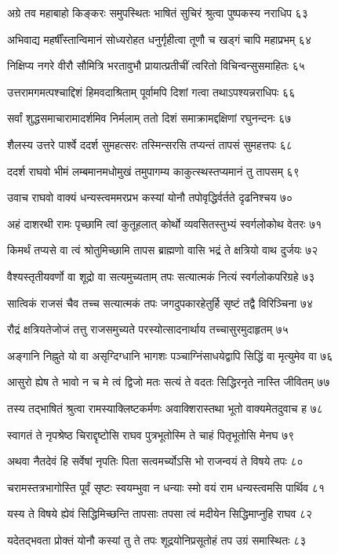 अग्रे तव महाबाहो किङ्करः समुपस्थितः
भाषितं सुचिरं श्रुत्वा पुष्पकस्य नराधिप ६३

अभिवाद्य महर्षींस्तान्विमानं सोध्यरोहत
धनुर्गृहीत्वा तूणौ च खड्गं चापि महाप्रभम् ६४

निक्षिप्य नगरे वीरौ सौमित्रि भरतावुभौ
प्रायात्प्रतीचीं त्वरितो विचिन्वन्सुसमाहितः ६५

उत्तरामगमत्पश्चाद्दिशं हिमवदाश्रिताम्
पूर्वामपि दिशां गत्वा तथाऽपश्यन्नराधिपः ६६

सर्वां शुद्धसमाचारामादर्शमिव निर्मलाम्
ततो दिशं समाक्रामद्दक्षिणां रघुनन्दनः ६७

शैलस्य उत्तरे पार्श्वे ददर्श सुमहत्सरः
तस्मिन्सरसि तप्यन्तं तापसं सुमहत्तपः ६८

ददर्श राघवो भीमं लम्बमानमधोमुखं
तमुपागम्य काकुत्स्थस्तप्यमानं तु तापसम् ६९

उवाच राघवो वाक्यं धन्यस्त्वममरप्रभ
कस्यां योनौ तपोवृद्धिर्वर्तते दृढनिश्चय ७०

अहं दाशरथी रामः पृच्छामि त्वां कुतूहलात्
कोर्थो व्यवसितस्तुभ्यं स्वर्गलोकोथ वेतरः ७१

किमर्थं तप्यसे वा त्वं श्रोतुमिच्छामि तापस
ब्राह्मणो वासि भद्रं ते क्षत्रियो वाथ दुर्जयः ७२

वैश्यस्तृतीयवर्णो वा शूद्रो वा सत्यमुच्यताम्
तपः सत्यात्मकं नित्यं स्वर्गलोकपरिग्रहे ७३

सात्विकं राजसं चैव तच्च सत्यात्मकं तपः
जगदुपकारहेतुर्हि सृष्टं तद्वै विरिञ्चिना ७४

रौद्रं क्षत्रियतेजोजं तत्तु राजसमुच्यते
परस्योत्सादनार्थाय तच्चासुरमुदाहृतम् ७५

अङ्गानि निह्नुते यो वा असृग्दिग्धानि भागशः
पञ्चाग्निंसाधयेद्वापि सिद्धिं वा मृत्युमेव वा ७६

आसुरो ह्येष ते भावो न च मे त्वं द्विजो मतः
सत्यं ते वदतः सिद्धिरनृते नास्ति जीवितम् ७७

तस्य तद्भाषितं श्रुत्वा रामस्याक्लिष्टकर्मणः
अवाक्शिरास्तथा भूतो वाक्यमेतदुवाच ह ७८

स्वागतं ते नृपश्रेष्ठ चिराद्दृष्टोसि राघव
पुत्रभूतोस्मि ते चाहं पितृभूतोसि मेनघ ७९

अथवा नैतदेवं हि सर्वेषां नृपतिः पिता
सत्वमर्च्योऽसि भो राजन्वयं ते विषये तपः ८०

चरामस्तत्रभागोस्ति पूर्वं सृष्टः स्वयम्भुवा
न धन्याः स्मो वयं राम धन्यस्त्वमसि पार्थिव ८१

यस्य ते विषये ह्येवं सिद्धिमिच्छन्ति तापसाः
तपसा त्वं मदीयेन सिद्धिमाप्नुहि राघव ८२

यदेतद्भवता प्रोक्तं योनौ कस्यां तु ते तपः
शूद्रयोनिप्रसूतोहं तप उग्रं समास्थितः ८३

